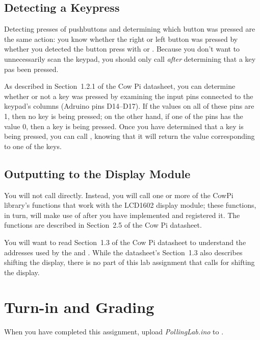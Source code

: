 \subsection{Detecting a Keypress}

Detecting presses of pushbuttons and determining which button was pressed are the same action: you know whether the right or left button was pressed by whether you detected the button press with  or .
Because you don't want to unnecessarily scan the keypad, you should only call  \textit{after} determining that a key pas been pressed.

As described in Section~1.2.1 of the Cow Pi datasheet, you can determine whether or not a key was pressed by examining the input pins connected to the keypad's columns (Adruino pins D14--D17).
If the values on all of these pins are 1, then no key is being pressed;
on the other hand, if one of the pins has the value 0, then a key is being pressed.
Once you have determined that a key is being pressed, you can call , knowing that it will return the value corresponding to one of the keys.


\subsection{Outputting to the Display Module}

You will not call  directly.
Instead, you will call one or more of the CowPi library's functions that work with the LCD1602 display module; these functions, in turn, will make use of  after you have implemented and registered it.
The functions are described in Section~2.5 of the Cow Pi datasheet.

You will want to read Section~1.3 of the Cow Pi datasheet to understand the addresses used by the  and .
While the datasheet's Section~1.3 also describes shifting the display, there is no part of this lab assignment that calls for shifting the display.



\section*{Turn-in and Grading}

When you have completed this assignment, upload \textit{PollingLab.ino} to
\filesubmission.


